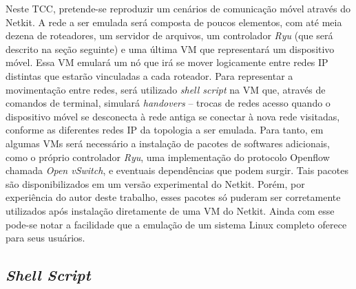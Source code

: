 \documentclass[	12pt, Times, openright, twoside, a4paper, english, brazil]{abntex2}
\begin{document}


Neste TCC, pretende-se reproduzir um cenários de comunicação móvel através do Netkit. A rede a ser emulada será composta de poucos elementos, com até meia dezena de roteadores, um servidor de arquivos, um controlador \textit{Ryu} (que será descrito na seção seguinte) e uma última VM que representará um dispositivo móvel. Essa VM emulará um nó que irá se mover logicamente entre redes IP distintas que estarão vinculadas a cada roteador. Para representar a movimentação entre redes, será utilizado \textit{shell script} na VM que, através de comandos de terminal, simulará \textit{handovers} -- trocas de redes acesso quando o dispositivo móvel se desconecta à rede antiga se conectar à nova rede visitadas, conforme as diferentes redes IP da topologia a ser emulada. Para tanto, em algumas VMs será necessário a instalação de pacotes de softwares adicionais, como o próprio controlador  \textit{Ryu},  uma implementação do protocolo Openflow chamada \textit{Open vSwitch}, e eventuais dependências que podem surgir. Tais pacotes são disponibilizados em um versão experimental do Netkit. Porém, por experiência do autor deste trabalho, esses pacotes só puderam ser corretamente utilizados após instalação diretamente de uma VM do Netkit. Ainda com esse 
pode-se notar a facilidade que a emulação de um sistema Linux completo oferece para seus usuários.


\subsection{\textit{Shell Script}}
\end{document}
